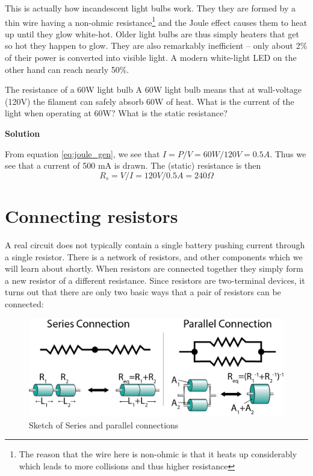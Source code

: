 \documentclass{tufte-book}
\newcommand\Solution{\par\textbf{\textsf{Solution}}\par\medskip}
\begin{document}
This is actually how incandescent light bulbs work. They they are formed by a thin wire having a non-ohmic resistance\footnote{The reason that the wire here is non-ohmic is that it heats up considerably which leads to more collisions and thus higher resistance} and the Joule effect causes them to heat up until they glow white-hot. Older light bulbs are thus simply heaters that get so hot they happen to glow. They are also remarkably inefficient -- only about 2\% of their power is converted into visible light. A modern white-light LED on the other hand can reach nearly 50\%.



\begin{myexample}[label = ex:res_lightbulb]{The resistance of a 60W light bulb}
A 60W light bulb means that at wall-voltage (120V) the filament can safely absorb 60W of heat. What is the current of the light when operating at 60W? What is the static resistance?
\Solution %
From equation \ref{eq:joule_gen}, we see that $I = P/V = 60W/120V = 0.5A$. Thus we see that a current of 500 mA is drawn. The (static) resistance is then 
$$
R_s = V/I = 120V/0.5A = 240 \Omega
$$
\end{myexample}







\section{Connecting resistors}
A real circuit does not typically contain a single battery pushing current through a single resistor. There is a network of resistors, and other components which we will learn about shortly. When resistors are connected together they simply form a new resistor of a different resistance. Since resistors are two-terminal devices, it turns out that there are only two basic ways that a pair of resistors can be connected:

\begin{figure}[h]
\caption{Sketch of Series and parallel connections}
\label{fig:res_series_parallel}
\begin{center}
\includegraphics[width=\textwidth]{res_series_parallel.png}
\end{center}
\end{figure}
\end{document}

